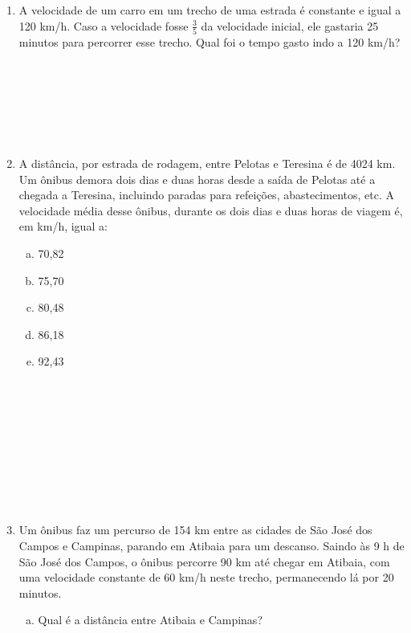 \documentclass[a4paper,14pt]{article}
\begin{document}
\begin{multicols}{2}
\begin{enumerate}
            \item A velocidade de um carro em um trecho de uma estrada é constante e igual a 120 km/h. Caso a velocidade fosse $\frac{3}{5}$ da velocidade inicial, ele gastaria 25 minutos para percorrer esse trecho. Qual foi o tempo gasto indo a 120 km/h? \\\\\\\\\\\\\\
            \item A distância, por estrada de rodagem, entre Pelotas e Teresina é de 4024 km. Um ônibus demora dois dias e duas horas desde a saída de Pelotas até a chegada a Teresina, incluindo paradas para refeições, abastecimentos, etc. A velocidade média desse ônibus, durante os dois dias e duas horas de viagem é, em km/h, igual a:
            \begin{enumerate}[a)]
            	\item 70,82
            	\item 75,70
            	\item 80,48
            	\item 86,18
            	\item 92,43 \\\\\\\\\\\\\\\\\\\\
            \end{enumerate}
            \item Um ônibus faz um percurso de 154 km entre as cidades de São José dos Campos e Campinas, parando em Atibaia para um descanso. Saindo às 9 h de São José dos Campos, o ônibus percorre 90 km até chegar em Atibaia, com uma velocidade constante de 60 km/h neste trecho, permanecendo lá por 20 minutos.
            \begin{enumerate}[a)]
            	\item Qual é a distância entre Atibaia e Campinas? \\\\\\\\\\\\\\\\\\\\

\end{enumerate}
\end{enumerate}
\end{multicols}
\end{document}
